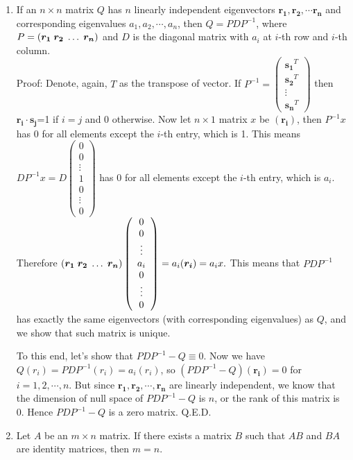 \documentclass[11pt,a4paper]{article}
\begin{document}
\begin {enumerate}
\item If an $n\times n$ matrix $Q$ has $n$ linearly independent eigenvectors $\bm{r_1}, \bm{r_2},\cdots \bm{r_n}$ and corresponding eigenvalues $a_1,a_2,\cdots, a_n$, then $Q=PDP^{-1}$, where $P=(\bm{r_1}\thickspace \bm{r_2}\thickspace\ldots\thickspace \bm{r_n})$ and $D$ is the diagonal matrix with $a_i$ at $i$-th row and $i$-th column.\\
Proof: Denote, again, $T$ as the transpose of vector. If $P^{-1}=\left(\begin{array}{cccc}\bm{s_1}^{T}\\ \bm{s_2}^{T}\\ \vdots\\ \bm{s_n}^{T}\end{array}\right)$ then $\bm{r_i}\cdot \bm{s_j}$=1 if $i=j$ and 0 otherwise. Now let $n\times 1$ matrix $x$ be $(\bm{r_i})$, then $P^{-1}x$ has 0 for all elements except the $i$-th entry, which is 1. This means $DP^{-1}x=D\left(\begin{array}{cccccc}0\\0\\ \vdots\\1\\0\\ \vdots\\ 0\end{array}\right)$ has 0 for all elements except the $i$-th entry, which is $a_i$. Therefore $(\bm{r_1}\thickspace \bm{r_2}\thickspace\ldots\thickspace \bm{r_n})\left(\begin{array}{cccccc}0\\0\\ \vdots\\a_i\\0\\ \vdots\\ 0\end{array}\right)=a_i(\bm{r_i})=a_{i}x.$ This means that $PDP^{-1}$ has exactly the same eigenvectors (with corresponding eigenvalues) as $Q$, and we show that such matrix is unique.

To this end, let's show that $PDP^{-1}-Q\equiv 0$. Now we have $Q(r_i)=PDP^{-1}(r_i)=a_i(r_i)$, so $(PDP^{-1}-Q)(\bm{r_i})=0$ for $i=1,2,\cdots , n$. But since $\bm{r_1}, \bm{r_2}, \cdots , \bm{r_n}$ are linearly independent, we know that the dimension of null space of $PDP^{-1}-Q$ is $n$, or the rank of this matrix is 0. Hence $PDP^{-1}-Q$ is a zero matrix. Q.E.D.

\item Let $A$ be an $m\times n$ matrix. If there exists a matrix $B$ such that $AB$ and $BA$ are identity matrices, then $m=n$.


\end{enumerate}
\end{document}
